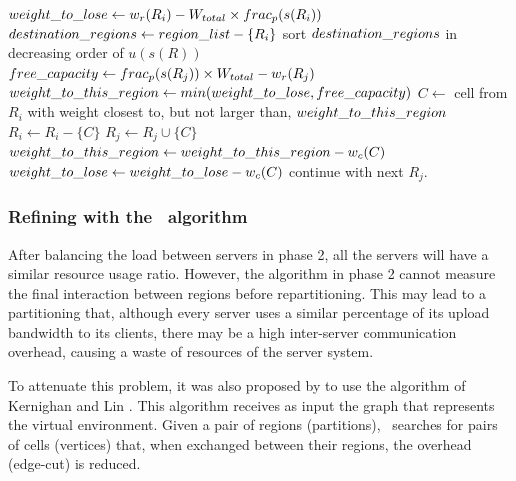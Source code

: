\begin{algorithm}
\caption{\bfa}
\label{alg:bfa}
\begin{algorithmic}[1]

			\STATE $weight\_to\_lose \leftarrow w_r(R_i) - W_{total} \times frac_p(s(R_i))$ \label{alg:bfa:wlose}
			\STATE $destination\_regions \leftarrow region\_list - \{R_i\}$
			\STATE sort $destination\_regions$ in decreasing order of $u(s(R))$ \label{alg:bfa:sort}
				 \STATE $free\_capacity \leftarrow frac_p(s(R_j)) \times W_{total} - w_r(R_j)$ \label{alg:bfa:freecap}
				 \STATE $weight\_to\_this\_region \leftarrow min(weight\_to\_lose, free\_capacity)$ \label{alg:bfa:min}
				 			 \STATE $C \leftarrow$ cell from $R_i$ with weight closest to, but not larger than, $weight\_to\_this\_region$ \label{alg:bfa:bestfit}
				 			 \STATE $R_i \leftarrow R_i - \{C\}$
				 			 \STATE $R_j \leftarrow R_j \cup \{C\}$
				 			 \STATE $weight\_to\_this\_region \leftarrow weight\_to\_this\_region - w_c(C)$
				 			 \STATE $weight\_to\_lose \leftarrow weight\_to\_lose - w_c(C)$
				 		\ELSE
				 			 \STATE continue with next $R_j$. \label{alg:bfa:continue}
				 		\ENDIF
				 \ENDWHILE
			\ENDFOR			
	 \ENDFOR

\end{algorithmic}
\end{algorithm}


\subsubsection{Refining with the \kl\ algorithm}
\label{sec:alg:kl}
	
After balancing the load between servers in phase 2, all the servers will have a similar resource usage ratio. However, the algorithm in phase 2 cannot measure the final interaction between regions before repartitioning. This may lead to a partitioning that, although every server uses a similar percentage of its upload bandwidth to its clients, there may be a high inter-server communication overhead, causing a waste of resources of the server system.

To attenuate this problem, it was also proposed by \cite{bezerra2009lbs} to use the algorithm of Kernighan and Lin \cite{kernighan1970ehp}. This algorithm receives as input the graph that represents the virtual environment. Given a pair of regions (partitions), \kl\ searches for pairs of cells (vertices) that, when exchanged between their regions, the overhead (edge-cut) is reduced.

